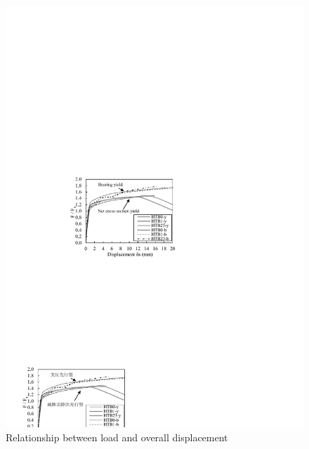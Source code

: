 \begin{figure}
    \centering
    \begin{minipage}[t]{0.48\textwidth}
    \includegraphics[width=\linewidth]{imgs/ch4/fig16.pdf}
    \caption{Relationship between load and overall displacement}
    \label{ch4fig16}
    \end{minipage}
    \begin{minipage}[t]{0.48\textwidth}

\end{minipage}
\end{figure}
